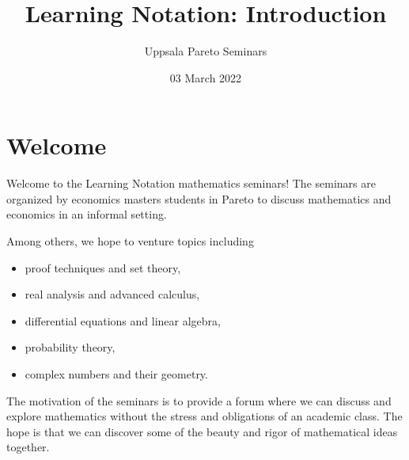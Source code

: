 \documentclass{article}[12pt]
\title{Learning Notation: Introduction}
\author{
    Uppsala Pareto Seminars
    }
\date{03 March 2022}
\begin{document}
    
    \maketitle %
        
    \section*{Welcome} %
        
        Welcome to the Learning Notation mathematics seminars! The seminars are organized by economics masters students in Pareto to discuss mathematics and economics in an informal setting.
        
        Among others, we hope to venture topics including
        
        \begin{itemize}
            
            \item
            proof techniques and set theory,
            
            \item
            real analysis and advanced calculus,
            
            \item
            differential equations and linear algebra,
            
            \item
            probability theory,
            
            \item
            complex numbers and their geometry.
            
        \end{itemize}
        
        The motivation of the seminars is to provide a forum where we can discuss and explore mathematics without the stress and obligations of an academic class. The hope is that we can discover some of the beauty and rigor of mathematical ideas together.
        
\end{document}
